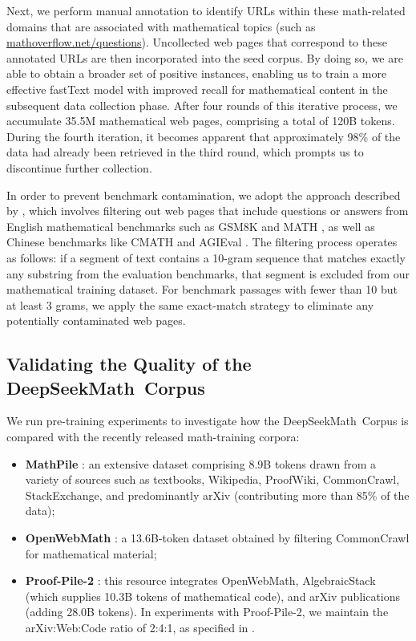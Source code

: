 \begin{itemize}[topsep=0pt]
Next, we perform manual annotation to identify URLs within these math-related domains that are associated with mathematical topics (such as \url{mathoverflow.net/questions}). Uncollected web pages that correspond to these annotated URLs are then incorporated into the seed corpus. By doing so, we are able to obtain a broader set of positive instances, enabling us to train a more effective fastText model with improved recall for mathematical content in the subsequent data collection phase. After four rounds of this iterative process, we accumulate 35.5M mathematical web pages, comprising a total of 120B tokens. During the fourth iteration, it becomes apparent that approximately 98\% of the data had already been retrieved in the third round, which prompts us to discontinue further collection.

In order to prevent benchmark contamination, we adopt the approach described by \cite{deepseek-coder}, which involves filtering out web pages that include questions or answers from English mathematical benchmarks such as GSM8K \citep{gsm8k} and MATH \citep{MATH}, as well as Chinese benchmarks like CMATH \citep{wei2023cmath} and AGIEval \citep{agieval}. The filtering process operates as follows: if a segment of text contains a 10-gram sequence that matches exactly any substring from the evaluation benchmarks, that segment is excluded from our mathematical training dataset. For benchmark passages with fewer than 10 but at least 3 grams, we apply the same exact-match strategy to eliminate any potentially contaminated web pages.

\subsection{Validating the Quality of the DeepSeekMath~Corpus}

We run pre-training experiments to investigate how the DeepSeekMath~Corpus is compared with the recently released math-training corpora:

\begin{itemize}[topsep=0pt]
    \item \textbf{MathPile} \citep{mathpile}: an extensive dataset comprising 8.9B tokens drawn from a variety of sources such as textbooks, Wikipedia, ProofWiki, CommonCrawl, StackExchange, and predominantly arXiv (contributing more than 85\% of the data);
    \item \textbf{OpenWebMath} \citep{openwebmath}: a 13.6B-token dataset obtained by filtering CommonCrawl for mathematical material;
    \item \textbf{Proof-Pile-2} \citep{llemma}: this resource integrates OpenWebMath, AlgebraicStack (which supplies 10.3B tokens of mathematical code), and arXiv publications (adding 28.0B tokens). In experiments with Proof-Pile-2, we maintain the arXiv:Web:Code ratio of 2:4:1, as specified in \cite{llemma}.
\end{itemize}


\end{itemize}
